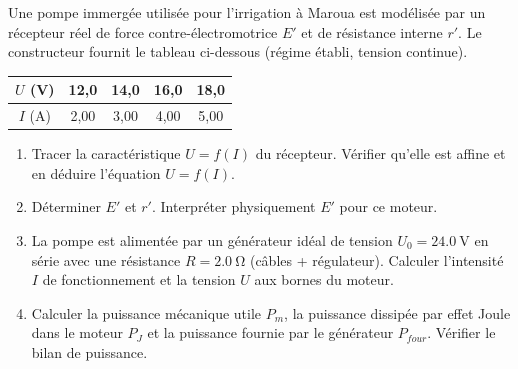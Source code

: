 \documentclass[11pt]{article}
\begin{document}
\begin{exercice}
Une pompe immergée utilisée pour l'irrigation à Maroua est modélisée par un récepteur réel de force contre-électromotrice $E'$ et de résistance interne $r'$. Le constructeur fournit le tableau ci-dessous (régime établi, tension continue).
\begin{center}
\begin{tabular}{|c|c|c|c|c|}
\hline
$U$ (\si{\volt}) & 12,0 & 14,0 & 16,0 & 18,0 \\
\hline
$I$ (\si{\ampere}) & 2,00 & 3,00 & 4,00 & 5,00 \\
\hline
\end{tabular}
\end{center}
\begin{enumerate}
    \item Tracer la caractéristique $U = f(I)$ du récepteur. Vérifier qu'elle est affine et en déduire l'équation $U = f(I)$.
    \item Déterminer $E'$ et $r'$. Interpréter physiquement $E'$ pour ce moteur.
    \item La pompe est alimentée par un générateur idéal de tension $U_0 = \SI{24,0}{\volt}$ en série avec une résistance $R = \SI{2,0}{\ohm}$ (câbles + régulateur). Calculer l'intensité $I$ de fonctionnement et la tension $U$ aux bornes du moteur.
    \item Calculer la puissance mécanique utile $P_m$, la puissance dissipée par effet Joule dans le moteur $P_J$ et la puissance fournie par le générateur $P_{four}$. Vérifier le bilan de puissance.
\end{enumerate}
\end{exercice}
\end{document}

